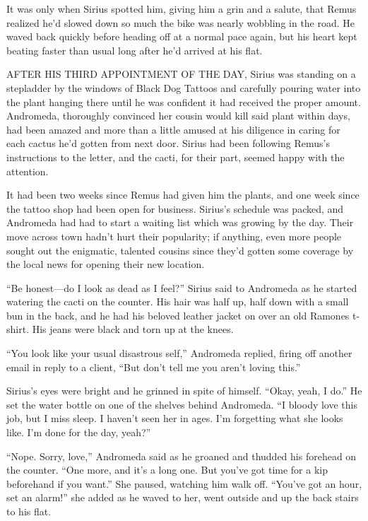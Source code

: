 It was only when Sirius spotted him, giving him a grin and a salute, that Remus realized he’d slowed down so much the bike was nearly wobbling in the road. He waved back quickly before heading off at a normal pace again, but his heart kept beating faster than usual long after he’d arrived at his flat.

\newpage


AFTER HIS THIRD APPOINTMENT OF THE DAY, Sirius was standing on a stepladder by the windows of Black Dog Tattoos and carefully pouring water into the plant hanging there until he was confident it had received the proper amount. Andromeda, thoroughly convinced her cousin would kill said plant within days, had been amazed and more than a little amused at his diligence in caring for each cactus he’d gotten from next door. Sirius had been following Remus’s instructions to the letter, and the cacti, for their part, seemed happy with the attention.

It had been two weeks since Remus had given him the plants, and one week since the tattoo shop had been open for business. Sirius’s schedule was packed, and Andromeda had had to start a waiting list which was growing by the day. Their move across town hadn’t hurt their popularity; if anything, even more people sought out the enigmatic, talented cousins since they’d gotten some coverage by the local news for opening their new location.

“Be honest—do I look as dead as I feel?” Sirius said to Andromeda as he started watering the cacti on the counter. His hair was half up, half down with a small bun in the back, and he had his beloved leather jacket on over an old Ramones t-shirt. His jeans were black and torn up at the knees.

“You look like your usual disastrous self,” Andromeda replied, firing off another email in reply to a client, “But don’t tell me you aren’t loving this.”

Sirius’s eyes were bright and he grinned in spite of himself. “Okay, yeah, I do.” He set the water bottle on one of the shelves behind Andromeda. “I bloody love this job, but I miss sleep. I haven’t seen her in ages. I’m forgetting what she looks like. I’m done for the day, yeah?”

“Nope. Sorry, love,” Andromeda said as he groaned and thudded his forehead on the counter. “One more, and it’s a long one. But you’ve got time for a kip beforehand if you want.” She paused, watching him walk off. “You’ve got an hour, set an alarm!” she added as he waved to her, went outside and up the back stairs to his flat.

